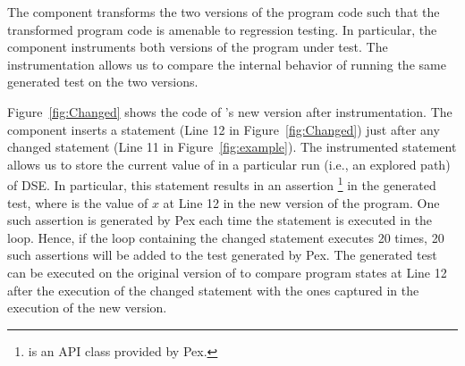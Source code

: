 
The  component transforms the two versions of the
program code such that the transformed program code is
amenable to regression testing. In particular, the  component
instruments both versions of the program under test. The
instrumentation allows us to compare the internal behavior
of running the same generated test on the two versions.
	
	Figure~\ref{fig:Changed} shows the code of 's new version after instrumentation. The  component inserts a statement (Line 12 in Figure~\ref{fig:Changed}) just after any changed	 statement (Line 11 in Figure~\ref{fig:example}). The instrumented statement allows us to store the current value of  in a particular run (i.e., an explored path) of DSE. In particular, this statement results in an assertion \footnote{ is an API class provided by Pex.} in the generated test, where  is the value of $x$ at Line 12 in the new version of the program. One such assertion is generated by Pex each time the statement is executed in the loop. Hence, if the loop containing the changed statement executes 20 times, 20 such assertions will be added to the test generated by Pex.
The generated test can be executed on the original version of  to compare program states at Line 12 after the execution of the changed statement with the ones captured in the execution of the new version. 
			
